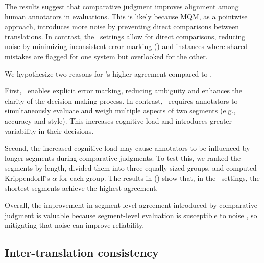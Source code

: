The results suggest that comparative judgment improves alignment among human annotators in evaluations. This is likely because MQM, as a pointwise approach, introduces more noise by preventing direct comparisons between translations. In contrast, the \sxs~settings allow for direct comparisons, reducing noise by minimizing inconsistent error marking () and instances where shared mistakes are flagged for one system but overlooked for the other.

We hypothesize two reasons for \sxsmqm's higher agreement compared to \sxsqr. 

First, \sxsmqm~enables explicit error marking, reducing ambiguity and enhances the clarity of the decision-making process. In contrast, \sxsqr~requires annotators to simultaneously evaluate and weigh multiple aspects of two segments (e.g., accuracy and style). This increases cognitive load and introduces greater variability in their decisions.

Second, the increased cognitive load may cause annotators to be influenced by longer segments during comparative judgments. To test this, we ranked the segments by length, divided them into three equally sized groups, and computed Krippendorff's $\alpha$ for each group. The results in  () show that, in the \sxs~settings, the shortest segments achieve the highest agreement.

Overall, the improvement in segment-level agreement introduced by comparative judgment is valuable because segment-level evaluation is susceptible to noise \citep{freitag-etal-2023-results}, so mitigating that noise can improve reliability.

\subsection{Inter-translation consistency}\label{sec:itc}



